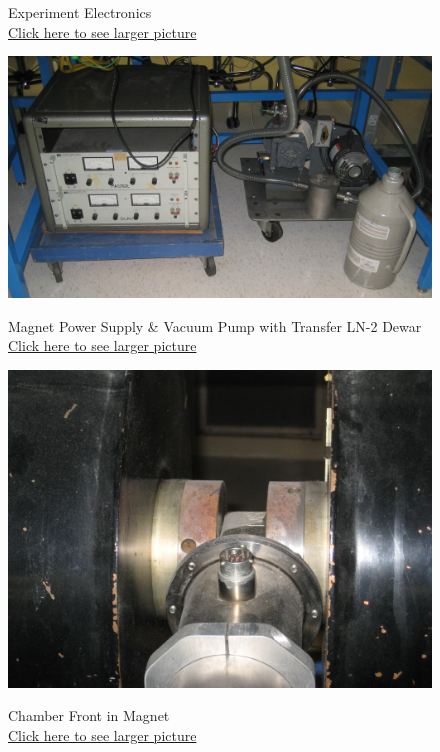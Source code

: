 \documentclass{../lab}
\begin{document}
\begin{figure}[H]
  \caption{Experiment Electronics \\
  \href{http://experimentationlab.berkeley.edu/sites/default/files/images/SHE_Electronics_3546_Crop.jpg}{Click here to see larger picture}}
  \label{fig:SHE_Electronics_3546_Crop.jpg}
\endminipage\hfill
{}
  \href{http://experimentationlab.berkeley.edu/sites/default/files/images/SHE_Mag_Pwr_Crop_3547.jpg}{\includegraphics[width=\linewidth,keepaspectratio]{images/SHE_Mag_Pwr_Crop_3547.jpg}}
  \caption{Magnet Power Supply \& Vacuum Pump with Transfer LN-2 Dewar \\ \href{http://experimentationlab.berkeley.edu/sites/default/files/images/SHE_Mag_Pwr_Crop_3547.jpg}{Click here to see larger picture}}\label{fig:SHE_Mag_Pwr_Crop_3547.jpg}
\endminipage\hfill
{}
  \href{http://experimentationlab.berkeley.edu/sites/default/files/images/Chamber_Front_3304.jpg}{\includegraphics[width=\linewidth,keepaspectratio]{images/Chamber_Front_3304.jpg}}
  \caption{Chamber Front in Magnet \\ \href{http://experimentationlab.berkeley.edu/sites/default/files/images/Chamber_Front_3304.jpg}{Click here to see larger picture}}\label{fig:Chamber_Front_3304.jpg}
\endminipage
\end{figure}
\end{document}
